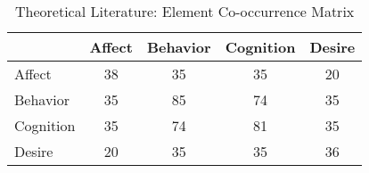 \begin{table}
\begin{minipage}[t][\textheight][t]{\textwidth}

\caption{\label{tab:TheoriesElementCooccurrences}Theoretical Literature: Element Co-occurrence Matrix}
\begin{tabular}[t]{lcccc}
\toprule
  & Affect & Behavior & Cognition & Desire\\
\midrule
Affect & 38 & 35 & 35 & 20\\
Behavior & 35 & 85 & 74 & 35\\
Cognition & 35 & 74 & 81 & 35\\
Desire & 20 & 35 & 35 & 36\\
\bottomrule
\end{tabular}
\end{minipage}
\end{table}
